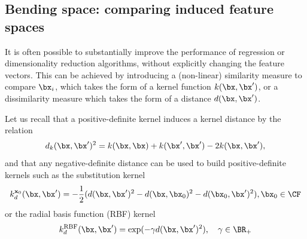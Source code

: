 
\subsection{Bending space: comparing induced feature spaces}

It is often possible to substantially improve the performance of regression or dimensionality reduction algorithms, without explicitly changing the feature vectors. This can be achieved by introducing a (non-linear) similarity measure to compare $\bx_i$, which takes the form of a kernel function $k(\bx,\bx^{\prime})$, or a dissimilarity measure which takes the form of a distance $d(\bx,\bx^{\prime})$.

Let us recall that a positive-definite kernel induces a kernel distance by the relation\cite{scholkopf2001kernel}
\begin{equation}
    d_k(\bx,\bx^{\prime})^2 = k(\bx,\bx) + k(\bx^{\prime},\bx^{\prime}) -2k(\bx,\bx^{\prime}),
    \label{eq:kernel_distance_relation}
\end{equation}
and that any negative-definite distance can be used to build positive-definite kernels such as the substitution kernel\cite{haasdonk2004learning}
\begin{equation}
k_d^{\mathbf{x}_0}(\bx,\bx^{\prime}) = -\frac12(d(\bx,\bx^{\prime})^2 - d(\bx,\bx_0)^2 - d(\bx_0,\bx^{\prime})^2),  \bx_0\in\CF \label{eq:k-0}
\end{equation}
or the radial basis function (RBF) kernel
\begin{equation}
k_d^{\textrm{RBF}}(\bx,\bx^{\prime}) = \exp(-\gamma d(\bx,\bx^{\prime})^2),\quad \gamma\in\BR_+ \label{eq:k-rbf}
\end{equation}


